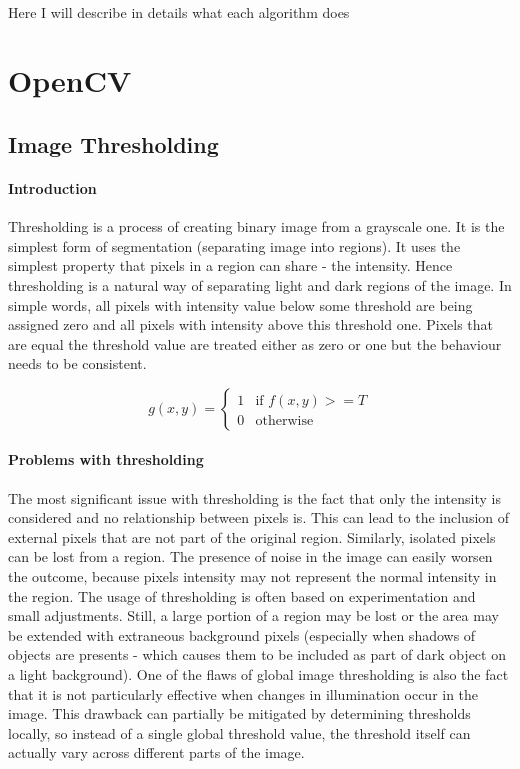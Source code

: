 \paragraph{}
Here I will describe in details what each algorithm does

\section{OpenCV}
\subsection{Image Thresholding}
\paragraph{Introduction}
Thresholding is a process of creating binary image from a grayscale one.\cite{digital-image-processing} It is the simplest form of segmentation (separating image into regions). It uses the simplest property that pixels in a region can share - the intensity. Hence thresholding is a natural way of separating light and dark regions of the image. In simple words, all pixels with intensity value below some threshold are being assigned zero and all pixels with intensity above this threshold one. Pixels that are equal the threshold value are treated either as zero or one but the behaviour needs to be consistent. 

\begin{equation}
	g(x, y) = \begin{cases}
		1 & \text{if $f(x, y) >= T$}\\
		0 & \text{otherwise}
	\end{cases}
\end{equation}

\paragraph{Problems with thresholding}
The most significant issue with thresholding is the fact that only the intensity is considered and no relationship between pixels is. This can lead to the inclusion of external pixels that are not part of the original region. Similarly, isolated pixels can be lost from a region. The presence of noise in the image can easily worsen the outcome, because pixels intensity may not represent the normal intensity in the region. The usage of thresholding is often based on experimentation and small adjustments. Still, a large portion of a region may be lost or the area may be extended with extraneous background pixels (especially when shadows of objects are presents - which causes them to be included as part of dark object on a light background). One of the flaws of global image thresholding is also the fact that it is not particularly effective when changes in illumination occur in the image. This drawback can partially be mitigated by determining thresholds locally, so instead of a single global threshold value, the threshold itself can actually vary across different parts of the image.

